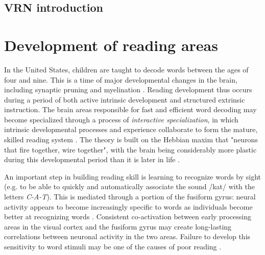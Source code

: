 \subsection{VRN introduction}




\section{Development of reading areas}

In the United States, children are taught to decode words between the ages of four and nine. This is a time of major developmental changes in the brain, including synaptic pruning and myelination \cite{Wandell2013}. Reading development thus occurs during a period of both active intrinsic development and structured extrinsic instruction. The brain areas responsible for fast and efficient word decoding may become specialized through a process of \textit{interactive specialization}, in which intrinsic developmental processes and experience collaborate to form the mature, skilled reading system \cite{Johnson2011, Klingberg2014}. The theory is built on the Hebbian maxim that "neurons that fire together, wire together", with the brain being considerably more plastic during this developmental period than it is later in life \cite{Hebb1949}.

An important step in building reading skill is learning to recognize words by sight (e.g. to be able to quickly and automatically associate the sound /kat/ with the letters \textit{C-A-T}). This is mediated through a portion of the fusiform gyrus: neural activity appears to become increasingly specific to words as individuals become better at recognizing words \cite{Mccandliss2003, Schlaggar2007}. Consistent co-activation between early processing areas in the visual cortex and the fusiform gyrus may create long-lasting correlations between neuronal activity in the two areas. Failure to develop this sensitivity to word stimuli may be one of the causes of poor reading \cite{He2013}.  


